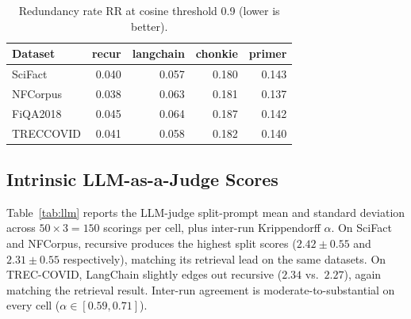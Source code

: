 \documentclass[conference]{IEEEtran}
\begin{document}
\begin{table}[!t]
\caption{Redundancy rate $\mathrm{RR}$ at cosine threshold 0.9 (lower is better).}
\label{tab:rr}
\centering
\setlength{\tabcolsep}{4pt}
\begin{tabular}{lrrrr}
\toprule
Dataset & recur & langchain & chonkie & primer \\
\midrule
SciFact   & 0.040 & 0.057 & 0.180 & 0.143 \\
NFCorpus  & 0.038 & 0.063 & 0.181 & 0.137 \\
FiQA2018  & 0.045 & 0.064 & 0.187 & 0.142 \\
TRECCOVID & 0.041 & 0.058 & 0.182 & 0.140 \\
\bottomrule
\end{tabular}
\end{table}

\subsection{Intrinsic LLM-as-a-Judge Scores}

Table~\ref{tab:llm} reports the LLM-judge split-prompt mean and standard
deviation across $50 \times 3 = 150$ scorings per cell, plus inter-run
Krippendorff $\alpha$. On SciFact and NFCorpus, recursive produces the
highest split scores ($2.42 \pm 0.55$ and $2.31 \pm 0.55$ respectively),
matching its retrieval lead on the same datasets. On TREC-COVID, LangChain
slightly edges out recursive ($2.34$ vs.\ $2.27$), again matching the
retrieval result. Inter-run agreement is moderate-to-substantial on every
cell ($\alpha \in [0.59, 0.71]$).
\end{document}
